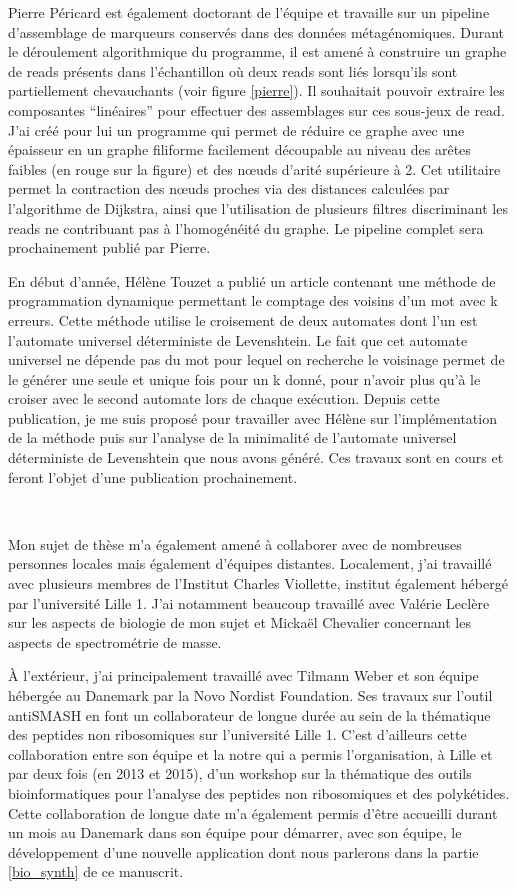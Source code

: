 Pierre Péricard est également doctorant de l'équipe et travaille sur un pipeline d'assemblage de marqueurs conservés dans des données métagénomiques.
Durant le déroulement algorithmique du programme, il est amené à construire un graphe de reads présents dans l'échantillon où deux reads sont liés lorsqu'ils sont partiellement chevauchants (voir figure \ref{pierre}).
Il souhaitait pouvoir extraire les composantes ``linéaires'' pour effectuer des assemblages sur ces sous-jeux de read.
J'ai créé pour lui un programme qui permet de réduire ce graphe avec une épaisseur en un graphe filiforme facilement découpable au niveau des arêtes faibles (en rouge sur la figure) et des n\oe{}uds d'arité supérieure à 2.
Cet utilitaire permet la contraction des n\oe{}uds proches via des distances calculées par l'algorithme de Dijkstra, ainsi que l'utilisation de plusieurs filtres discriminant les reads ne contribuant pas à l'homogénéité du graphe.
Le pipeline complet sera prochainement publié par Pierre.

En début d'année, Hélène Touzet a publié un article contenant une méthode de programmation dynamique permettant le comptage des voisins d'un mot avec k erreurs.
Cette méthode utilise le croisement de deux automates dont l'un est l'automate universel déterministe de Levenshtein.
Le fait que cet automate universel ne dépende pas du mot pour lequel on recherche le voisinage permet de le générer une seule et unique fois pour un k donné, pour n'avoir plus qu'à le croiser avec le second automate lors de chaque exécution.
Depuis cette publication, je me suis proposé pour travailler avec Hélène sur l'implémentation de la méthode puis sur l'analyse de la minimalité de l'automate universel déterministe de Levenshtein que nous avons généré.
Ces travaux sont en cours et feront l'objet d'une publication prochainement.

~~

Mon sujet de thèse m'a également amené à collaborer avec de nombreuses personnes locales mais également d'équipes distantes.
Localement, j'ai travaillé avec plusieurs membres de l'Institut Charles Viollette, institut également hébergé par l'université Lille 1.
J'ai notamment beaucoup travaillé avec Valérie Leclère sur les aspects de biologie de mon sujet et Mickaël Chevalier concernant les aspects de spectrométrie de masse.

À l'extérieur, j'ai principalement travaillé avec Tilmann Weber et son équipe hébergée au Danemark par la Novo Nordist Foundation.
Ses travaux sur l'outil antiSMASH en font un collaborateur de longue durée au sein de la thématique des peptides non ribosomiques sur l'université Lille 1.
C'est d'ailleurs cette collaboration entre son équipe et la notre qui a permis l'organisation, à Lille et par deux fois (en 2013 et 2015), d'un workshop sur la thématique des outils bioinformatiques pour l'analyse des peptides non ribosomiques et des polykétides.
Cette collaboration de longue date m'a également permis d'être accueilli durant un mois au Danemark dans son équipe pour démarrer, avec son équipe, le développement d'une nouvelle application dont nous parlerons dans la partie \ref{bio_synth} de ce manuscrit.

